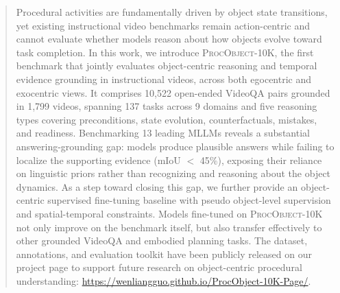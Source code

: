 \begin{abstract}
Procedural activities are fundamentally driven by object state transitions, yet existing instructional video benchmarks remain action-centric and cannot evaluate whether models reason about how objects evolve toward task completion. In this work, we introduce \textsc{ProcObject-10K}, the first benchmark that jointly evaluates object-centric reasoning and temporal evidence grounding in instructional videos, across both egocentric and exocentric views. It comprises 10,522 open-ended VideoQA pairs grounded in 1,799 videos, spanning 137 tasks across 9 domains and five reasoning types covering preconditions, state evolution, counterfactuals, mistakes, and readiness. Benchmarking 13 leading MLLMs reveals a substantial answering-grounding gap: models produce plausible answers while failing to localize the supporting evidence (mIoU $<$ 45\%), exposing their reliance on linguistic priors rather than recognizing and reasoning about the object dynamics. As a step toward closing this gap, we further provide an object-centric supervised fine-tuning baseline with pseudo object-level supervision and spatial-temporal constraints. Models fine-tuned on \textsc{ProcObject-10K} not only improve on the benchmark itself, but also transfer effectively to other grounded VideoQA and embodied planning tasks. The dataset, annotations, and evaluation toolkit have been publicly released on our project page to support future research on object-centric procedural understanding: \url{https://wenliangguo.github.io/ProcObject-10K-Page/}.
\end{abstract}